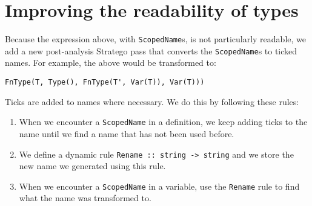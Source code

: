 \section{Improving the readability of types}

Because the expression above, with \verb|ScopedName|s, is not particularly readable, we add a new post-analysis Stratego pass that converts the \verb|ScopedName|s to ticked names. For example, the above would be transformed to:

\begin{lstlisting}
FnType(T, Type(), FnType(T', Var(T)), Var(T)))
\end{lstlisting}
Ticks are added to names where necessary. We do this by following these rules:

\begin{enumerate}
	\item When we encounter a \verb|ScopedName| in a definition, we keep adding ticks to the name until we find a name that has not been used before. 
	\item We define a dynamic rule \verb|Rename :: string -> string| and we store the new name we generated using this rule.
	\item When we encounter a \verb|ScopedName| in a variable, use the \verb|Rename| rule to find what the name was transformed to.
\end{enumerate}

